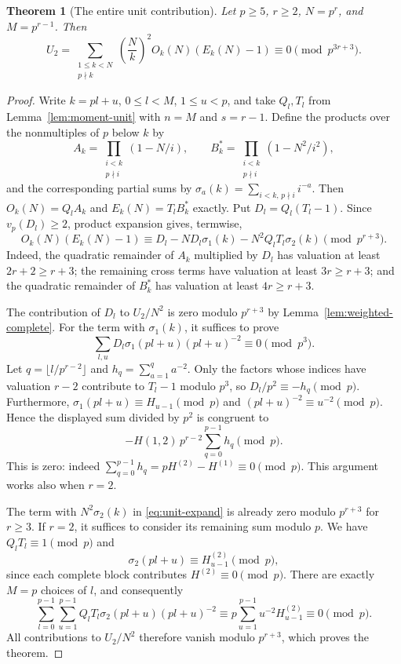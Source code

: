 \documentclass[11pt]{amsart}
\newtheorem{theorem}{Theorem}[section]
\theoremstyle{definition}
\theoremstyle{remark}
\begin{document}
\begin{theorem}[The entire unit contribution]\label{thm:unit-all}
Let $p\ge5$, $r\ge2$, $N=p^r$, and $M=p^{r-1}$. Then
\[
 U_2=\sum_{\substack{1\le k<N\\p\nmid k}}
 \left(\frac Nk\right)^2O_k(N)(E_k(N)-1)
 \equiv0\pmod{p^{3r+3}}.
\]
\end{theorem}
\begin{proof}
Write $k=pl+u$, $0\le l<M$, $1\le u<p$, and take $Q_l,T_l$ from
Lemma~\ref{lem:moment-unit} with $n=M$ and $s=r-1$.
Define the products over the nonmultiples of $p$ below $k$ by
\[
 A_k=\prod_{\substack{i<k\\p\nmid i}}(1-N/i),\qquad
 B_k^*=\prod_{\substack{i<k\\p\nmid i}}(1-N^2/i^2),
\]
and the corresponding partial sums by
$\sigma_a(k)=\sum_{i<k,\,p\nmid i}i^{-a}$.
Then $O_k(N)=Q_lA_k$ and $E_k(N)=T_lB_k^*$ exactly. Put
$D_l=Q_l(T_l-1)$. Since $v_p(D_l)\ge2$, product expansion gives, termwise,
\begin{equation}\label{eq:unit-expand}
O_k(N)(E_k(N)-1)
\equiv D_l-ND_l\sigma_1(k)-N^2Q_lT_l\sigma_2(k)
\pmod{p^{r+3}}.
\end{equation}
Indeed, the quadratic remainder of $A_k$ multiplied by $D_l$ has
valuation at least $2r+2\ge r+3$; the remaining cross terms have
valuation at least $3r\ge r+3$; and the quadratic remainder of $B_k^*$
has valuation at least $4r\ge r+3$.

The contribution of $D_l$ to $U_2/N^2$ is zero modulo $p^{r+3}$ by
Lemma~\ref{lem:weighted-complete}.
For the term with $\sigma_1(k)$, it suffices to prove
\[
\sum_{l,u}D_l\sigma_1(pl+u)(pl+u)^{-2}\equiv0\pmod{p^3}.
\]
Let $q=\lfloor l/p^{r-2}\rfloor$ and $h_q=\sum_{a=1}^qa^{-2}$.
Only the factors whose indices have valuation $r-2$ contribute to
$T_l-1$ modulo $p^3$, so $D_l/p^2\equiv-h_q\pmod p$.
Furthermore,
$\sigma_1(pl+u)\equiv H_{u-1}\pmod p$ and
$(pl+u)^{-2}\equiv u^{-2}\pmod p$. Hence the displayed sum divided by
$p^2$ is congruent to
\[
-H(1,2)\,p^{r-2}\sum_{q=0}^{p-1}h_q\pmod p.
\]
This is zero: indeed
$\sum_{q=0}^{p-1}h_q=pH^{(2)}-H^{(1)}\equiv0\pmod p$.
This argument works also when $r=2$.

The term with $N^2\sigma_2(k)$ in \eqref{eq:unit-expand} is already
zero modulo $p^{r+3}$ for $r\ge3$. If $r=2$, it suffices to consider its
remaining sum modulo $p$. We have $Q_lT_l\equiv1\pmod p$ and
\[
\sigma_2(pl+u)\equiv H_{u-1}^{(2)}\pmod p,
\]
since each complete block contributes $H^{(2)}\equiv0\pmod p$.
There are exactly $M=p$ choices of $l$, and consequently
\[
\sum_{l=0}^{p-1}\sum_{u=1}^{p-1}
 Q_lT_l\sigma_2(pl+u)(pl+u)^{-2}
\equiv p\sum_{u=1}^{p-1}u^{-2}H_{u-1}^{(2)}\equiv0\pmod p.
\]
All contributions to $U_2/N^2$ therefore vanish modulo $p^{r+3}$,
which proves the theorem.
\end{proof}
\end{document}
